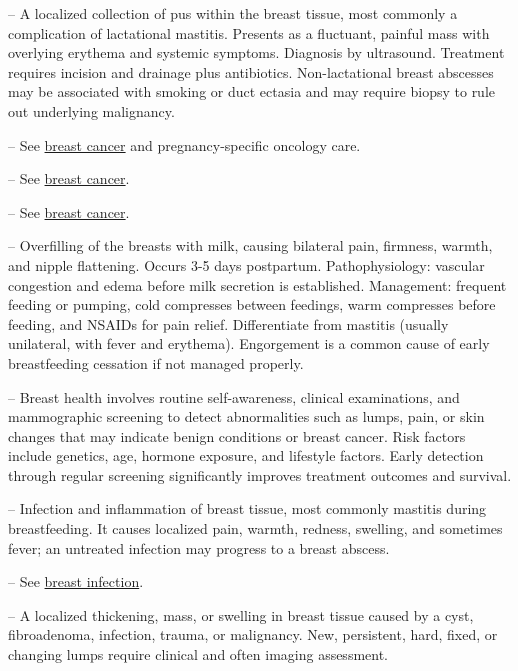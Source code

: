 -- A localized collection of pus within the breast tissue, most commonly a complication of lactational mastitis. Presents as a fluctuant, painful mass with overlying erythema and systemic symptoms. Diagnosis by ultrasound. Treatment requires incision and drainage plus antibiotics. Non-lactational breast abscesses may be associated with smoking or duct ectasia and may require biopsy to rule out underlying malignancy.

-- See \hyperlink{Breast Cancer}{breast cancer} and pregnancy-specific oncology care.

-- See \hyperlink{Breast Cancer}{breast cancer}.

-- See \hyperlink{Breast Cancer}{breast cancer}.

-- Overfilling of the breasts with milk, causing bilateral pain, firmness, warmth, and nipple flattening. Occurs 3-5 days postpartum. Pathophysiology: vascular congestion and edema before milk secretion is established. Management: frequent feeding or pumping, cold compresses between feedings, warm compresses before feeding, and NSAIDs for pain relief. Differentiate from mastitis (usually unilateral, with fever and erythema). Engorgement is a common cause of early breastfeeding cessation if not managed properly.

-- Breast health involves routine self-awareness, clinical examinations, and mammographic screening to detect abnormalities such as lumps, pain, or skin changes that may indicate benign conditions or breast cancer. Risk factors include genetics, age, hormone exposure, and lifestyle factors. Early detection through regular screening significantly improves treatment outcomes and survival.

-- Infection and inflammation of breast tissue, most commonly mastitis during breastfeeding. It causes localized pain, warmth, redness, swelling, and sometimes fever; an untreated infection may progress to a breast abscess.

-- See \hyperlink{Breast Infection}{breast infection}.

-- A localized thickening, mass, or swelling in breast tissue caused by a cyst, fibroadenoma, infection, trauma, or malignancy. New, persistent, hard, fixed, or changing lumps require clinical and often imaging assessment.

